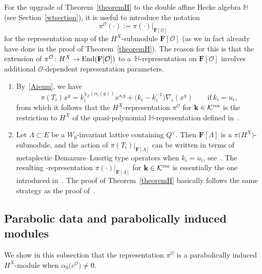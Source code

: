  For the upgrade of Theorem~\ref{theoremH} to the double affine Hecke algebra $\mathbb{H}$ (see Section~\ref{wtsection}), it is useful to introduce the notation
 \begin{equation*}%
 \pi^\mathcal{O}(\cdot):=\pi(\cdot)\vert_{\mathbf{F}[\mathcal{O}]}
 \end{equation*}
 for the representation map of the $H^X$-submodule $\mathbf{F}[\mathcal{O}]$ (as we in fact already have done in the proof of Theorem~\ref{theoremH}). The reason for this is that the extension of $\pi^{\mathcal{O}}\colon H^X\rightarrow\textup{End}(\mathbf{F}[\mathcal{O}])$ to a~$\mathbb{H}$-representation on $\mathbf{F}[\mathcal{O}]$ involves additional $\mathcal{O}$-dependent representation parameters.

\begin{Remark}\quad
\begin{enumerate}\itemsep=0pt
\item
By~\eqref{Aisum}, we have
\begin{equation*}%
\pi(T_i)x^y=k_i^{\chi_{\mathbb{Z}}(\alpha_i(y))}x^{s_iy}+\bigl(k_i-k_i^{-1}\bigr)\nabla_i(x^y)\qquad
\text{if}\ k_i=u_i,
\end{equation*}
from which it follows that the $H^X$-representation $\pi^\mathcal{O}$ for $\mathbf{k}\in\mathcal{K}^{{\rm res}}$ is the restriction to $H^X$ of the quasi-polynomial $\mathbb{H}$-representation defined in~\cite[Theorem~1.1] {SSV2}.
\item Let $\Lambda\subset E$ be a $W_0$-invariant lattice containing $Q^\vee$. Then $\mathbf{F}[\Lambda]$ is a $\pi\bigl(H^X\bigr)$-submodule, and the action of $\pi(T_i)\vert_{\mathbf{F}[\Lambda]}$ can be written in terms of metaplectic Demazure--Lusztig type operators when $k_i=u_i$, see~\cite{SSV2}.
The resulting -representation $\pi(\cdot)\vert_{\mathbf{F}[\Lambda]}$ for $\mathbf{k}\in\mathcal{K}^{{\rm res}}$ is essentially the one introduced in~\cite[Theorem~3.7]{SSV1}. The proof of
 Theorem~\ref{theoremH} basically follows the same strategy as the proof of~\cite[Theorem~3.7]{SSV1}.
 \end{enumerate}
 \end{Remark}
\subsection{Parabolic data and parabolically induced modules}\label{section_pi_mod}
We show in this subsection that the representation $\pi^\mathcal{O}$ is a parabolically induced $H^X$-module when $\alpha_0\bigl(c^\mathcal{O}\bigr)\not=0$.

